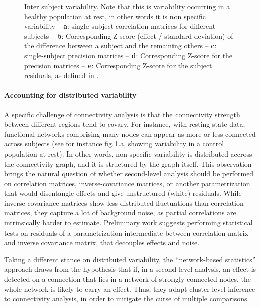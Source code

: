 \documentclass[5p]{elsarticle}
\begin{document}
\begin{figure}
\caption{Inter subject variability. Note that this is variability
occurring in a healthy population at rest, in other words it is non specific
variability -- \textbf{a}: single-subject
correlation matrices for different subjects -- \textbf{b}:
Corresponding Z-score (effect / standard deviation) of the difference
between a subject and the remaining others -- \textbf{c}:
single-subject precision matrices -- \textbf{d}: Corresponding Z-score
for the precision matrices -- \textbf{e}:
Corresponding Z-score for the subject residuals, as defined in 
\cite{varoquaux2010b}.
\label{fig:inter_subject}}
\end{figure}

\paragraph{Accounting for distributed variability}
%
A specific challenge of connectivity analysis is that the connectivity
strength between different regions tend to covary. For instance, with
resting-state data, functional networks comprising many nodes can appear
as more or less connected across subjects (see for instance
fig.\,\ref{fig:inter_subject}.a, showing variability in a control
population at rest). In other words, non-specific variability is
distributed accross the connectivity graph, and it is structured by the
graph itself. This observation brings the natural question of whether
second-level analysis should be performed on correlation matrices,
inverse-covariance matrices, or another parametrization that would
disentangle effects and give unstructured (white) residuals. While
inverse-covariance matrices show less distributed fluctuations than
correlation matrices, they capture a lot of background noise, as partial
correlations are intrinsically harder to estimate. Preliminary work
\cite{varoquaux2010b} suggests performing statistical tests on residuals of
a parametrization intermediate between correlation matrix and inverse
covariance matrix, that decouples effects and noise.

Taking a different stance on distributed variability, the ``network-based
statistics'' approach \cite{zalesky2010} draws from the hypothesis that
if, in a second-level analysis, an effect is detected on a connection
that lies in a network of strongly connected nodes, the whole network is
likely to carry an effect. Thus, they adapt cluster-level inference to
connectivity analysis, in order to mitigate the curse of multiple
comparisons.
\end{document}

